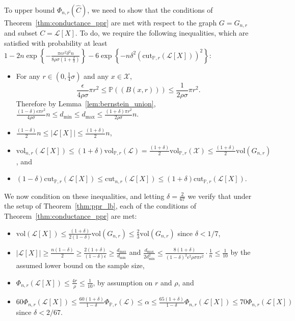 \documentclass[11pt,twoside]{article}
\theoremstyle{definition}
\newcommand{\set}[1]{\left\{#1\right\}}
\newcommand{\vol}{\mathrm{vol}}
\newcommand{\cut}{\mathrm{cut}}
\newcommand{\abs}[1]{\left \lvert #1 \right \rvert}
\newcommand{\1}{\mathbbm{1}}
\newcommand{\Xbf}{X}
\newcommand{\Pbb}{\mathbb{P}}
\newcommand{\Cest}{\widehat{C}}
\begin{document}
To upper bound $\Phi_{n,r}(\Cest)$, we need to show that the conditions of Theorem~\ref{thm:conductance_ppr} are met with respect to the graph $G = G_{n,r}$ and subset $C = \mathcal{L}[\Xbf]$. To do, we require the following inequalities, which are satisfied with probability at least $1 - 2n\exp\set{-\frac{\pi\epsilon r^2\delta^2n}{8 \rho \sigma(1 + \frac{\delta}{3})}} - 6 \exp\set{-n\delta^2(\cut_{\Pbb,r}(\mathcal{L}[\Xbf]))^2}$: 
\begin{itemize}
	\item For any $r \in (0,\frac{1}{4}\sigma)$ and any $x \in \mathcal{X}$,
	\begin{equation*}
	\frac{\epsilon}{4\rho\sigma}\pi r^2 \leq \Pbb((B(x,r))) \leq  \frac{1}{2\rho\sigma} \pi r^2.
	\end{equation*}
	Therefore by Lemma~\ref{lem:bernstein_union}, $\frac{(1 - \delta)\epsilon \pi r^2}{4\rho \sigma}n \leq d_{\min} \leq d_{\max} \leq \frac{(1 + \delta)\pi r^2}{2\rho \sigma }n$. 
	\item $\frac{(1 - \delta)}{2} n \leq \abs{\mathcal{L}[\Xbf]} \leq \frac{(1 + \delta)}{2} n$, 
	\item $\vol_{n,r}(\mathcal{L}[\Xbf]) \leq (1 + \delta)\vol_{\Pbb,r}(\mathcal{L}) = \frac{(1 + \delta)}{2} \vol_{\Pbb,r}(\mathcal{X}) \leq \frac{(1 + \delta)}{2} \vol(G_{n,r})$, and
	\item $(1 - \delta) \cut_{\Pbb,r}(\mathcal{L}[\Xbf]) \leq \cut_{n,r}(\mathcal{L}[\Xbf]) \leq (1 + \delta) \cut_{\Pbb,r}(\mathcal{L}[\Xbf])$.
\end{itemize}
We now condition on these inequalities, and letting $\delta = \frac{2}{67}$ we verify that under the setup of Theorem~\ref{thm:ppr_lb}, each of the conditions of Theorem~\ref{thm:conductance_ppr} are met:
\begin{itemize}
	\item $\vol(\mathcal{L}[X]) \leq \frac{(1 + \delta)}{2(1 - \delta)}\vol(G_{n,r}) \leq \frac{2}{3}\vol(G_{n,r})$ since $\delta < 1/7$,
	\item $\abs{\mathcal{L}[X]} \geq \frac{n(1 - \delta)}{2} \geq \frac{2(1 + \delta)}{(1 - \delta)\epsilon} \geq \frac{d_{\max}}{d_{\min}}$ and $\frac{d_{\max}}{2d_{\min}^2} \leq \frac{8(1 + \delta)}{(1 - \delta)^2 \epsilon^2 \rho \sigma \pi r^2} \cdot \frac{1}{n} \leq \frac{1}{10}$ by the assumed lower bound on the sample size,
	\item $\Phi_{n,r}(\mathcal{L}[X]) \leq \frac{4r}{\rho} \leq \frac{1}{10}$, by assumption on $r$ and $\rho$, and
	\item $60\Phi_{n,r}(\mathcal{L}[X]) \leq \frac{60(1 + \delta)}{1 - \delta}\Phi_{\Pbb,r}(\mathcal{L}) \leq \alpha \leq \frac{65(1 + \delta)}{1 - \delta}\Phi_{n,r}(\mathcal{L}[X]) \leq 70\Phi_{n,r}(\mathcal{L}[X])$ since $\delta < 2/67$. 
\end{itemize}
\end{document}
